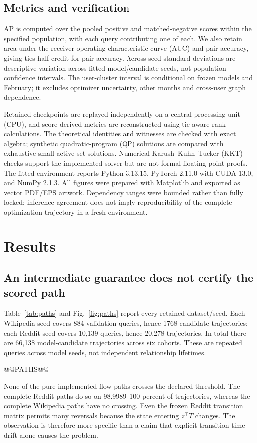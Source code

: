 \subsection{Metrics and verification}
AP is computed over the pooled positive and matched-negative scores within the specified population, with each query contributing one of each. We also retain area under the receiver operating characteristic curve (AUC) and pair accuracy, giving ties half credit for pair accuracy. Across-seed standard deviations are descriptive variation across fitted model/candidate seeds, not population confidence intervals. The user-cluster interval is conditional on frozen models and February; it excludes optimizer uncertainty, other months and cross-user graph dependence.

Retained checkpoints are replayed independently on a central processing unit (CPU), and score-derived metrics are reconstructed using tie-aware rank calculations. The theoretical identities and witnesses are checked with exact algebra; synthetic quadratic-program (QP) solutions are compared with exhaustive small active-set solutions. Numerical Karush--Kuhn--Tucker (KKT) checks support the implemented solver but are not formal floating-point proofs. The fitted environment reports Python 3.13.15, PyTorch 2.11.0 with CUDA 13.0, and NumPy 2.1.3. All figures were prepared with Matplotlib and exported as vector PDF/EPS artwork. Dependency ranges were bounded rather than fully locked; inference agreement does not imply reproducibility of the complete optimization trajectory in a fresh environment.

\section{Results}\label{sec:results}
\subsection{An intermediate guarantee does not certify the scored path}
Table~\ref{tab:paths} and Fig.~\ref{fig:paths} report every retained dataset/seed. Each Wikipedia seed covers 884 validation queries, hence 1768 candidate trajectories; each Reddit seed covers 10,139 queries, hence 20,278 trajectories. In total there are 66,138 model-candidate trajectories across six cohorts. These are repeated queries across model seeds, not independent relationship lifetimes.

@@PATHS@@

None of the pure implemented-flow paths crosses the declared threshold. The complete Reddit paths do so on 98.9989--100 percent of trajectories, whereas the complete Wikipedia paths have no crossing. Even the frozen Reddit transition matrix permits many reversals because the state entering $z^\top T$ changes. The observation is therefore more specific than a claim that explicit transition-time drift alone causes the problem.

